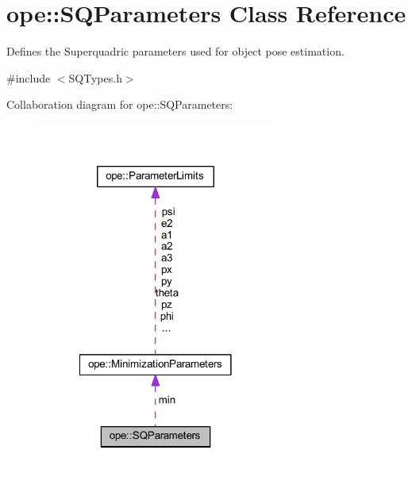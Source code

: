 \hypertarget{classope_1_1_s_q_parameters}{\section{ope\-:\-:S\-Q\-Parameters Class Reference}
\label{classope_1_1_s_q_parameters}
}


Defines the Superquadric parameters used for object pose estimation.  




{\ttfamily \#include $<$S\-Q\-Types.\-h$>$}



Collaboration diagram for ope\-:\-:S\-Q\-Parameters\-:
\nopagebreak
\begin{figure}[H]
\begin{center}
\leavevmode
\includegraphics[width=222pt]{classope_1_1_s_q_parameters__coll__graph}
\end{center}
\end{figure}
